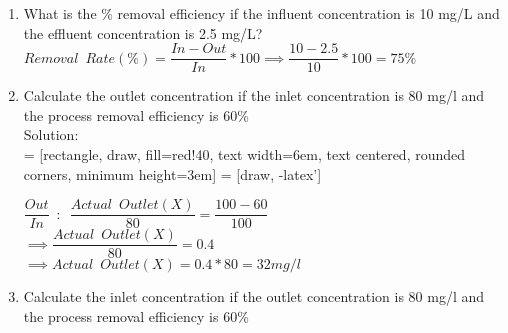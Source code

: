 \begin{enumerate}

\item What is the \% removal efficiency if the influent concentration is 10 mg/L and the effluent concentration is 2.5 mg/L?\\
$Removal \enspace Rate (\%) = \dfrac{In-Out}{In}*100 \implies \dfrac{10-2.5}{10}*100=\boxed{75\%}$



\item Calculate the outlet concentration if the inlet concentration is 80 mg/l and the process removal efficiency is 60\%\\
Solution:\\

 = [rectangle, draw, fill=red!40, 
    text width=6em, text centered, rounded corners, minimum height=3em]
 = [draw, -latex']
\begin{figure}[!h]
\centering
{}
\end{figure}

$\dfrac{Out}{In} \enspace:\enspace\dfrac{Actual \enspace Outlet (X)}{80}=\dfrac{100-60}{100}$\\
$\implies \dfrac{Actual \enspace Outlet (X)}{80} =0.4$\\
$\implies Actual \enspace  Outlet (X) = 0.4 * 80 = \boxed{32 mg/l}$\\


\item Calculate the inlet concentration if the outlet concentration is 80 mg/l and the process removal efficiency is 60\%\\


\end{enumerate}
